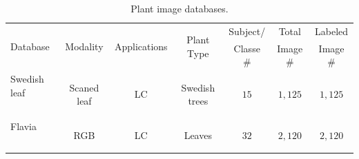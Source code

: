 \begin{table}[t!]
\centering
\begin{threeparttable}
\caption{Plant image databases.}
\begin{tabular}{l|c|c|c|c|c|c}
\hline
\multirow{2}{*}{Database}& \multirow{2}{*}{Modality} & \multirow{2}{*}{Applications}\tnote{a} & \multirow{2}{*}{Plant Type} & Subject/ &Total & Labeled \\
& & & & Classe \# & Image \# & Image \# \\ \hline
Swedish leaf & \multirow{2}{*}{Scaned leaf} & \multirow{2}{*}{LC} & \multirow{2}{*}{Swedish trees} & \multirow{2}{*}{$15$} & \multirow{2}{*}{$1,125$} & \multirow{2}{*}{$1,125$} \\
~\cite{soderkvist2001computer} & & & & & & \\ \hline
Flavia & \multirow{2}{*}{RGB} & \multirow{2}{*}{LC} & \multirow{2}{*}{Leaves} & \multirow{2}{*}{$32$} & \multirow{2}{*}{$2,120$} & \multirow{2}{*}{$2,120$} \\
~\cite{wu2007leaf} & & & & & & \\ \hline

\end{tabular}
\end{threeparttable}
\end{table}
